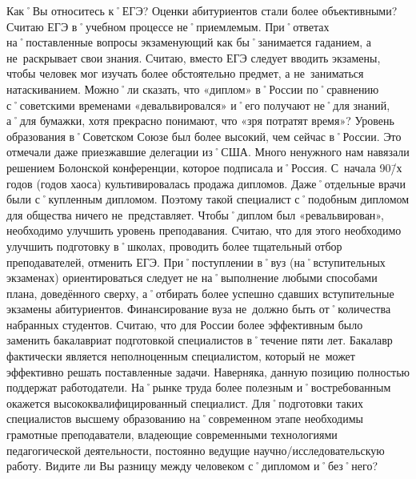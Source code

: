 \begin{drama}
	\maxspeaks Как˚Вы относитесь к˚ЕГЭ? Оценки абитуриентов стали более объективными?
	\michaelspeaks Считаю ЕГЭ в˚учебном процессе не˚приемлемым. При˚ответах на˚поставленные вопросы экзаменующий как бы˚занимается гаданием, а не~раскрывает свои знания. Считаю, вместо ЕГЭ следует вводить экзамены, чтобы человек мог изучать более обстоятельно предмет, а не~заниматься натаскиванием.
	\maxspeaks Можно˚ли сказать, что  «диплом» в˚России по˚сравнению с˚советскими временами «девальвировался» и˚его получают не˚для знаний, а˚для бумажки, хотя прекрасно понимают, что  «зря потратят время»?
	\michaelspeaks Уровень образования в˚Советском Союзе был более высокий, чем сейчас в˚России. Это отмечали даже приезжавшие делегации из˚США. Много ненужного нам навязали решением Болонской конференции, которое подписала и˚Россия. С~начала 90\=/х годов (годов хаоса) культивировалась продажа дипломов. Даже˚отдельные врачи были с˚купленным дипломом. Поэтому такой специалист с˚подобным дипломом для общества ничего не~представляет. Чтобы˚диплом был «ревальвирован», необходимо улучшить уровень преподавания. Считаю, что для этого необходимо улучшить подготовку в˚школах, проводить более тщательный отбор преподавателей, отменить ЕГЭ. При˚поступлении в˚вуз (на˚вступительных экзаменах) ориентироваться следует не на˚выполнение любыми способами плана, доведённого сверху, а˚отбирать более успешно сдавших вступительные экзамены абитуриентов. Финансирование вуза не~должно быть от˚количества набранных студентов. Считаю, что для России более эффективным было заменить бакалавриат подготовкой специалистов в˚течение пяти лет. Бакалавр фактически является неполноценным специалистом, который не~может эффективно решать поставленные задачи. Наверняка, данную позицию полностью поддержат работодатели. На˚рынке труда более полезным и˚востребованным окажется высококвалифицированный специалист. Для˚подготовки таких специалистов высшему образованию на˚современном этапе необходимы грамотные преподаватели, владеющие современными технологиями педагогической деятельности, постоянно ведущие научно\-/исследовательскую работу.	
	\maxspeaks Видите ли Вы разницу между человеком с˚дипломом и˚без˚него?
	
	\pagebreak
	

\end{drama}
